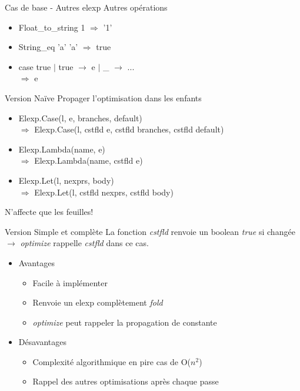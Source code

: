 \documentclass{beamer}
\begin{document}
\begin{frame}{Cas de base - Autres elexp}
Autres opérations
  \begin{itemize}
    \item Float\_to\_string 1 $\Rightarrow$ '1'
    \item String\_eq 'a' 'a' $\Rightarrow$ true 
    \item case true $\mid$ true $\rightarrow$ e $\mid$ \_ $\rightarrow$ ... \\ $\Rightarrow$ e
  \end{itemize}
\end{frame}
\begin{frame}{Version Naïve}
  Propager l'optimisation dans les enfants
  \begin{itemize}
  \item Elexp.Case(l, e, branches, default)
    \\ $\Rightarrow$ Elexp.Case(l, cstfld e, cstfld branches, cstfld default)
  \item Elexp.Lambda(name, e) \\ $\Rightarrow$ Elexp.Lambda(name, cstfld e)
  \item Elexp.Let(l, nexprs, body) \\ $\Rightarrow$ Elexp.Let(l, cstfld nexprs, cstfld body)
  \end{itemize}
\pause
N'affecte que les feuilles!
\end{frame}
\begin{frame}{Version Simple et complète}
  La fonction \emph{cstfld} renvoie un boolean \emph{true} si changée \\
  $\rightarrow$ \emph{optimize} rappelle \emph{cstfld} dans ce cas.
  \pause
  \begin{itemize}

    \item Avantages
      \begin{itemize}
        \item Facile à implémenter
        \item Renvoie un elexp complètement \emph{fold}
        \item \emph{optimize} peut rappeler la propagation de constante
      \end{itemize}
  \pause
    \item Désavantages
      \begin{itemize}
        \item Complexité algorithmique en pire cas de O($n^2$)
        \item Rappel des autres optimisations après chaque passe
      \end{itemize}

  \end{itemize}
\end{frame}
\end{document}

